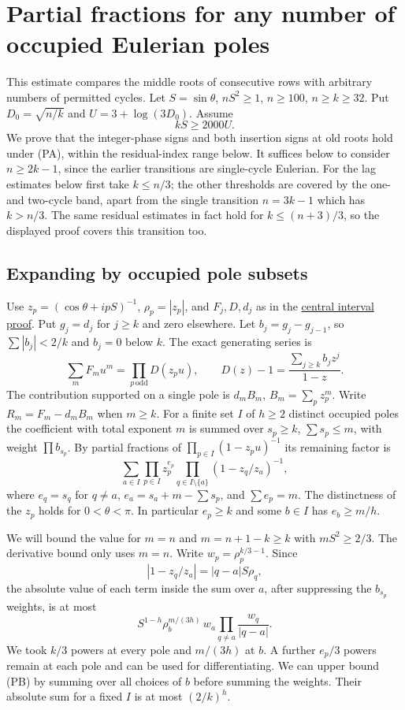 \section{Partial fractions for any number of occupied Eulerian poles}

This estimate compares the middle roots of consecutive rows with arbitrary numbers of permitted cycles. Let $S=\sin\theta$, $nS^2\ge1$, $n\ge100$, $n\ge k\ge32$. Put $D_0=\sqrt{n/k}$ and $U=3+\log(3D_0)$. Assume
\[
kS\ge2000 U. \tag{PA}
\]
We prove that the integer-phase signs and both insertion signs at old roots hold under (PA), within the residual-index range below. It suffices below to consider $n\ge2k-1$, since the earlier transitions are single-cycle Eulerian. For the lag estimates below first take $k\le n/3$; the other thresholds are covered by the one- and two-cycle band, apart from the single transition $n=3k-1$ which has $k>n/3$. The same residual estimates in fact hold for $k\le(n+3)/3$, so the displayed proof covers this transition too.

\subsection{Expanding by occupied pole subsets}

Use $z_p=(\cos\theta+ipS)^{-1}$, $\rho_p=|z_p|$, and $F_j,D,d_j$ as in the \href{https://github.com/ProgramComputer/open-math-research/blob/main/topics/long-cycle-excedances/central-interval.md}{central interval proof}. Put $g_j=d_j$ for $j\ge k$ and zero elsewhere. Let $b_j=g_j-g_{j-1}$, so $\sum|b_j|<2/k$ and $b_j=0$ below $k$. The exact generating series is
\[
\sum_m F_m u^m=\prod_{p\,\mathrm{odd}}D(z_pu),\qquad
D(z)-1=\frac{\sum_{j\ge k} b_j z^j}{1-z}.
\]
The contribution supported on a single pole is $d_m B_m$, $B_m=\sum_p z_p^m$. Write $R_m=F_m-d_m B_m$ when $m\ge k$. For a finite set $I$ of $h\ge2$ distinct occupied poles the coefficient with total exponent $m$ is summed over $s_p\ge k$, $\sum s_p\le m$, with weight $\prod b_{s_p}$. By partial fractions of $\prod_{p\in I}(1-z_pu)^{-1}$ its remaining factor is
\[
\sum_{a\in I} \prod_{p\in I} z_p^{e_p}
\prod_{q\in I\setminus\{a\}}(1-z_q/z_a)^{-1},
\]
where $e_q=s_q$ for $q\ne a$, $e_a=s_a+m-\sum s_p$, and $\sum e_p=m$. The distinctness of the $z_p$ holds for $0<\theta<\pi$. In particular $e_p\ge k$ and some $b\in I$ has $e_b\ge m/h$.

We will bound the value for $m=n$ and $m=n+1-k\ge k$ with $mS^2\ge2/3$. The derivative bound only uses $m=n$. Write $w_p=\rho_p^{k/3-1}$. Since
\[
|1-z_q/z_a|=|q-a| S\rho_q,
\]
the absolute value of each term inside the sum over $a$, after suppressing the $b_{s_p}$ weights, is at most
\[
S^{1-h}\rho_b^{m/(3h)}\,w_a\prod_{q\ne a}\frac{w_q}{|q-a|}. \tag{PB}
\]
We took $k/3$ powers at every pole and $m/(3h)$ at $b$. A further $e_p/3$ powers remain at each pole and can be used for differentiating. We can upper bound (PB) by summing over all choices of $b$ before summing the weights. Their absolute sum for a fixed $I$ is at most $(2/k)^h$.

